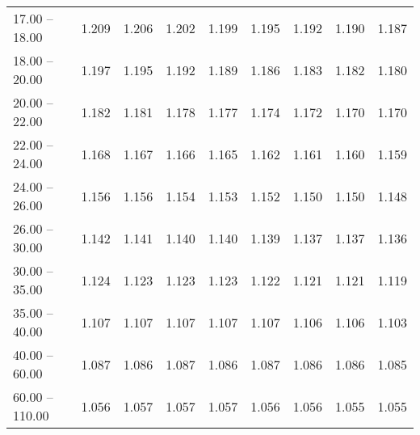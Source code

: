 \begin{table}[htp]
\begin{tiny}
\begin{center}
\begin{tabular}{|l|c|c|c|c|c|c|c|c|}
      17.00 -- 18.00 &  1.209 & 1.206 & 1.202 & 1.199 & 1.195 & 1.192 & 1.190 & 1.187 \\ 
      18.00 -- 20.00 &  1.197 & 1.195 & 1.192 & 1.189 & 1.186 & 1.183 & 1.182 & 1.180 \\ 
      20.00 -- 22.00 &  1.182 & 1.181 & 1.178 & 1.177 & 1.174 & 1.172 & 1.170 & 1.170 \\ 
      22.00 -- 24.00 &  1.168 & 1.167 & 1.166 & 1.165 & 1.162 & 1.161 & 1.160 & 1.159 \\ 
      24.00 -- 26.00 &  1.156 & 1.156 & 1.154 & 1.153 & 1.152 & 1.150 & 1.150 & 1.148 \\ 
      26.00 -- 30.00 &  1.142 & 1.141 & 1.140 & 1.140 & 1.139 & 1.137 & 1.137 & 1.136 \\ 
      30.00 -- 35.00 &  1.124 & 1.123 & 1.123 & 1.123 & 1.122 & 1.121 & 1.121 & 1.119 \\ 
      35.00 -- 40.00 &  1.107 & 1.107 & 1.107 & 1.107 & 1.107 & 1.106 & 1.106 & 1.103 \\ 
      40.00 -- 60.00 &  1.087 & 1.086 & 1.087 & 1.086 & 1.087 & 1.086 & 1.086 & 1.085 \\ 
      60.00 -- 110.00 &  1.056 & 1.057 & 1.057 & 1.057 & 1.056 & 1.056 & 1.055 & 1.055 \\ 
\hline
\end{tabular} 
             \end{center} 
             \end{tiny} 
             \label{tab:sa_trpm_jpsi8} 
             \end{table}


